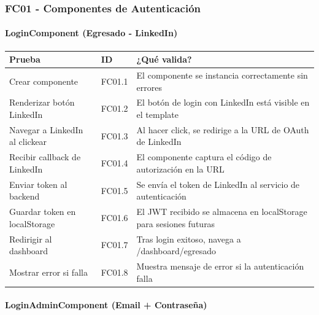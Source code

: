 \subsubsection{FC01 - Componentes de Autenticación}

\paragraph{LoginComponent (Egresado - LinkedIn)}

\begin{table}[H]
\centering
\begin{tabular}{|l|l|p{6cm}|}
\hline
\textbf{Prueba} & \textbf{ID} & \textbf{¿Qué valida?} \\ \hline
Crear componente & FC01.1 & El componente se instancia correctamente sin errores \\ \hline
Renderizar botón LinkedIn & FC01.2 & El botón de login con LinkedIn está visible en el template \\ \hline
Navegar a LinkedIn al clickear & FC01.3 & Al hacer click, se redirige a la URL de OAuth de LinkedIn \\ \hline
Recibir callback de LinkedIn & FC01.4 & El componente captura el código de autorización en la URL \\ \hline
Enviar token al backend & FC01.5 & Se envía el token de LinkedIn al servicio de autenticación \\ \hline
Guardar token en localStorage & FC01.6 & El JWT recibido se almacena en localStorage para sesiones futuras \\ \hline
Redirigir al dashboard & FC01.7 & Tras login exitoso, navega a /dashboard/egresado \\ \hline
Mostrar error si falla & FC01.8 & Muestra mensaje de error si la autenticación falla \\ \hline
\end{tabular}
\end{table}

\paragraph{LoginAdminComponent (Email + Contraseña)}

